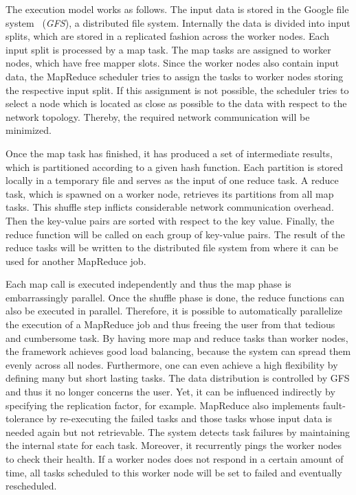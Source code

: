 The execution model works as follows.
The input data is stored in the Google file system~\cite{ghemawat:2003a} (\emph{GFS}), a distributed file system.
Internally the data is divided into input splits, which are stored in a replicated fashion across the worker nodes.
Each input split is processed by a map task.
The map tasks are assigned to worker nodes, which have free mapper slots.
Since the worker nodes also contain input data, the MapReduce scheduler tries to assign the tasks to worker nodes storing the respective input split.
If this assignment is not possible, the scheduler tries to select a node which is located as close as possible to the data with respect to the network topology.
Thereby, the required network communication will be minimized.

Once the map task has finished, it has produced a set of intermediate results, which is partitioned according to a given hash function.
Each partition is stored locally in a temporary file and serves as the input of one reduce task.
A reduce task, which is spawned on a worker node, retrieves its partitions from all map tasks.
This shuffle step inflicts considerable network communication overhead.
Then the key-value pairs are sorted with respect to the key value.
Finally, the reduce function will be called on each group of key-value pairs.
The result of the reduce tasks will be written to the distributed file system from where it can be used for another MapReduce job.

Each map call is executed independently and thus the map phase is embarrassingly parallel.
Once the shuffle phase is done, the reduce functions can also be executed in parallel.
Therefore, it is possible to automatically parallelize the execution of a MapReduce job and thus freeing the user from that tedious and cumbersome task.
By having more map and reduce tasks than worker nodes, the framework achieves good load balancing, because the system can spread them evenly across all nodes.
Furthermore, one can even achieve a high flexibility by defining many but short lasting tasks.
The data distribution is controlled by GFS and thus it no longer concerns the user.
Yet, it can be influenced indirectly by specifying the replication factor, for example.
MapReduce also implements fault-tolerance by re-executing the failed tasks and those tasks whose input data is needed again but not retrievable.
The system detects task failures by maintaining the internal state for each task.
Moreover, it recurrently pings the worker nodes to check their health.
If a worker nodes does not respond in a certain amount of time, all tasks scheduled to this worker node will be set to failed and eventually rescheduled.

